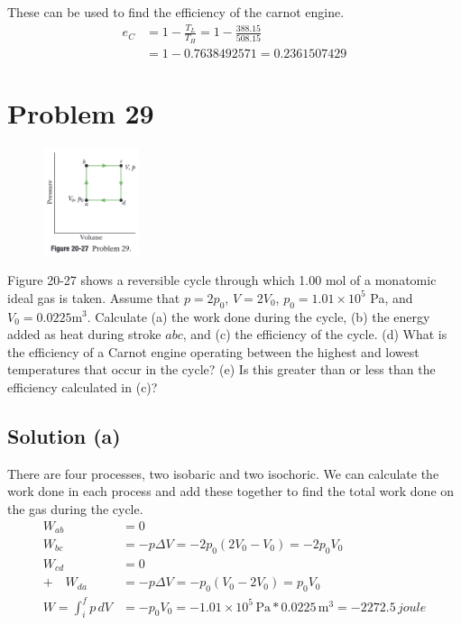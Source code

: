 \documentclass[12pt]{article}
\newcommand{\E}[1]{\times 10^{#1}}
\begin{document}
            These can be used to find the efficiency of the carnot engine.
            \begin{align}
                e_C &=  1 - \frac{T_L}{T_H}
                    =   1 - \frac{388.15}{508.15}\\
                    &=  1 - 0.7638492571
                    =   \boxed{0.2361507429}
            \end{align}

    \pagebreak
    \section{Problem 29}
        \begin{figure}
            \vspace{-30pt}
            \includegraphics[width=0.25\textwidth]{picture_20-27.png} 
        \end{figure}
        Figure 20-27 shows a reversible cycle through which 1.00 mol of a monatomic ideal gas is taken. 
        Assume that $p = 2p_0$, $V = 2V_0$, $p_0 = 1.01 \E{5}$ Pa, and $V_0 = 0.0225 \unit{\meter^3}$. 
        Calculate (a) the work done during the cycle, (b) the energy added as heat during stroke $abc$, and (c) the efficiency of the cycle. 
        (d) What is the efficiency of a Carnot engine operating between the highest and lowest temperatures that occur in the cycle? 
        (e) Is this greater than or less than the efficiency calculated in (c)?

        \subsection{Solution (a)}
            There are four processes, two isobaric and two isochoric.
            We can calculate the work done in each process and add these together to find the total work done on the gas during the cycle.
            \begin{align}
                W_{ab}  &=  0\\
                W_{bc}  &=  -p\Delta V
                    =   -2p_0 (2V_0 - V_0)
                    =   -2p_0 V_0\\
                W_{cd}  &=  0\\
                +\,\,\,\,\,\,
                W_{da}    &=  -p\Delta V
                    =   -p_0 (V_0 - 2V_0)
                    =   p_0 V_0\\
                \hline
                W   =   \int_{i}^{f} p\,dV
                    &=  -p_0 V_0
                    =   -1.01\E{5}\,\unit{\pascal} * 0.0225\,\unit{\meter^3}
                    =   \boxed{-2272.5\,\unit{joule}}
            \end{align} 
\end{document}
